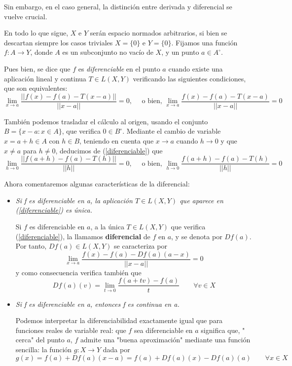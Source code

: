 \documentclass[a4paper, 12pt]{article}
\begin{document}
\begin{enumerate}[label=\textbf{\arabic*}.]
Sin embargo, en el caso general, la distinción entre derivada y diferencial se vuelve crucial.

En todo lo que sigue, \(X\) e \(Y\) serán espacio normados arbitrarios, si bien se descartan siempre los casos triviales \(X = \{0\}\) e \(Y = \{0\}\). Fijamos una función \(f: A \to Y\), donde \(A\) es un subconjunto no vacío de \(X\), y un punto \(a \in A^{\circ}\).

Pues bien, se dice que \(f\) es \textit{diferenciable} en el punto \(a\) cuando existe una aplicación lineal y continua \(T \in L(X,Y)\) verificando las siguientes condiciones, que son equivalentes:
\begin{equation}\label{diferenciable}
	\lim_{x \to a} \frac{|| f(x) - f(a) - T(x-a)||}{||x-a||} = 0, \quad \text{ o bien, } \lim_{x \to a} \frac{f(x) -f(a)- T(x-a)}{||x-a||} = 0
\end{equation}

También podemos trasladar el cálculo al origen, usando el conjunto \(B = \{ x-a : x \in A\}\), que verifica \( 0 \in B^{\circ}\). Mediante el cambio de variable \(x = a +h \in A\) con \(h \in B\), teniendo en cuenta que \(x \to a\) cuando \(h \to 0\) y que \(x \neq a\) para \(h \neq 0\), deducimos de (\ref{diferenciable}) que
\[
	\lim_{h \to 0} \frac{||f(a+h) - f(a) - T(h)||}{||h||} = 0, \quad \text{ o bien, } \lim_{h \to 0} \frac{f(a+h) - f(a) - T(h)}{||h||} = 0
\]

Ahora comentaremos algunas características de la diferencial:

\begin{itemize}
	\item \textit{Si f es diferenciable en a, la aplicación \(T \in L(X,Y)\) que aparece en (\ref{diferenciable}) es única.}
	
	Si \(f\) es diferenciable en \(a\), a la única \(T \in L(X,Y)\) que verifica (\ref{diferenciable}), la llamamos \textbf{diferencial} de \(f\) en \(a\), y se denota por \(D f(a)\). Por tanto, \(D f(a) \in L(X,Y)\) se caracteriza por
	\[
		\lim_{x \to a} \frac{f(x) - f(a) - Df(a)(a-x)}{||x-a||} = 0
	\]
	y como consecuencia verifica también que
	\[
		Df(a)(v) = \lim_{t \to 0} \frac{f(a + tv) - f(a)}{t} \qquad \forall v \in X
	\]
	
	\item \textit{Si f es diferenciable en a, entonces f es continua en a.}
	
	Podemos interpretar la diferenciabilidad exactamente igual que para funciones reales de variable real: que \(f\) sea diferenciable en \(a\) significa que, " cerca" del punto \(a\), \(f\) admite una "buena aproximación" mediante una función sencilla: la función \(g: X \to Y\) dada por
	\[
		g(x) = f(a) + Df(a)(x-a) = f(a) + Df(a)(x) - Df(a)(a) \qquad \forall x \in X
	\]
	

\end{itemize}
\end{enumerate}
\end{document}
